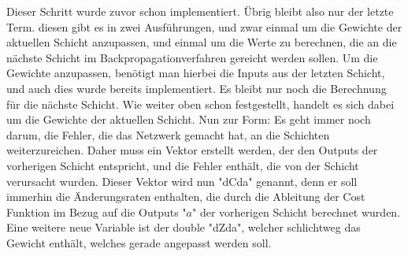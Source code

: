 \documentclass[12pt]{article}
\begin{document}
Dieser Schritt wurde zuvor schon implementiert.
Übrig bleibt also nur der letzte Term. diesen gibt es in zwei Ausführungen, und zwar einmal um die Gewichte der aktuellen Schicht anzupassen, und einmal um die Werte zu berechnen, die an die nächste Schicht im Backpropagationverfahren gereicht werden sollen.
Um die Gewichte anzupassen, benötigt man hierbei die Inputs aus der letzten Schicht, und auch dies wurde bereits implementiert. Es bleibt nur noch die Berechnung für die nächste Schicht. Wie weiter oben schon festgestellt, handelt es sich dabei um die Gewichte der aktuellen Schicht. 
Nun zur Form: Es geht immer noch darum, die Fehler, die das Netzwerk gemacht hat, an die Schichten weiterzureichen. Daher muss ein Vektor erstellt werden, der den Outputs der vorherigen Schicht entspricht, und die Fehler enthält, die von der Schicht verursacht wurden.
Dieser Vektor wird nun "dCda" genannt, denn er soll immerhin die Änderungsraten enthalten, die durch die Ableitung der Cost Funktion im Bezug auf die Outputs "$a$" der vorherigen Schicht berechnet wurden. Eine weitere neue Variable ist der double "dZda", welcher schlichtweg das Gewicht enthält, welches gerade angepasst werden soll.
\end{document}

